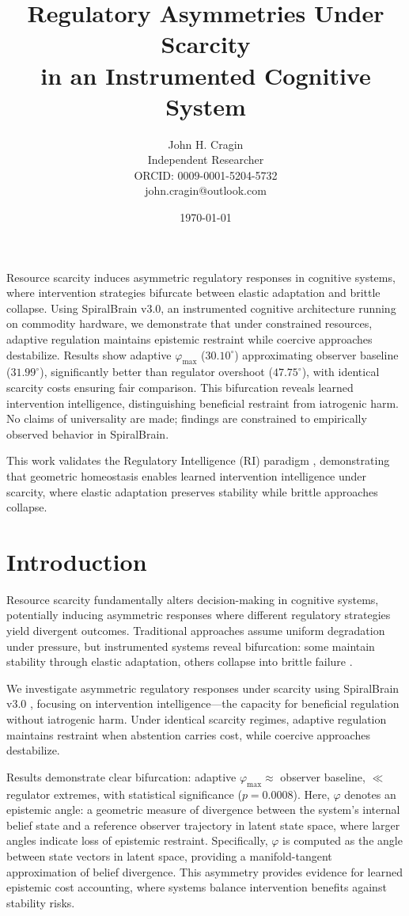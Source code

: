 \documentclass[12pt,a4paper]{article}
\title{Regulatory Asymmetries Under Scarcity \\
\large in an Instrumented Cognitive System}
\author{John H. Cragin \\
Independent Researcher \\
ORCID: 0009-0001-5204-5732 \\
john.cragin@outlook.com}
\date{\today}
\theoremstyle{plain}
\theoremstyle{definition}
\theoremstyle{remark}
\begin{document}
\maketitle

Resource scarcity induces asymmetric regulatory responses in cognitive systems, 
where intervention strategies bifurcate between elastic adaptation and brittle collapse. 
Using SpiralBrain v3.0, an instrumented cognitive architecture running on commodity hardware, 
we demonstrate that under constrained resources, adaptive regulation maintains epistemic restraint 
while coercive approaches destabilize. Results show adaptive $\varphi_{\max}$ ($30.10^\circ$) 
approximating observer baseline ($31.99^\circ$), significantly better than regulator overshoot 
($47.75^\circ$), with identical scarcity costs ensuring fair comparison. This bifurcation reveals 
learned intervention intelligence, distinguishing beneficial restraint from iatrogenic harm. 
No claims of universality are made; findings are constrained to empirically observed behavior 
in SpiralBrain.


This work validates the Regulatory Intelligence (RI) paradigm \cite{Cragin2026Thesis}, demonstrating that geometric homeostasis enables learned intervention intelligence under scarcity, where elastic adaptation preserves stability while brittle approaches collapse.

\section{Introduction}

Resource scarcity fundamentally alters decision-making in cognitive systems, potentially inducing asymmetric responses where different regulatory strategies yield divergent outcomes. Traditional approaches assume uniform degradation under pressure, but instrumented systems reveal bifurcation: some maintain stability through elastic adaptation, others collapse into brittle failure \cite{ashby1956introduction}.

We investigate asymmetric regulatory responses under scarcity using SpiralBrain v3.0 \cite{SpiralBrainRepo}, focusing on intervention intelligence—the capacity for beneficial regulation without iatrogenic harm. Under identical scarcity regimes, adaptive regulation maintains restraint when abstention carries cost, while coercive approaches destabilize.

Results demonstrate clear bifurcation: adaptive $\varphi_{\max} \approx$ observer baseline, 
$\ll$ regulator extremes, with statistical significance ($p = 0.0008$). 
Here, $\varphi$ denotes an epistemic angle: a geometric measure of divergence between the system's internal belief state and a reference observer trajectory in latent state space, where larger angles indicate loss of epistemic restraint.
Specifically, $\varphi$ is computed as the angle between state vectors in latent space, providing a manifold-tangent approximation of belief divergence.
This asymmetry provides evidence for learned epistemic cost accounting, 
where systems balance intervention benefits against stability risks.
\end{document}
